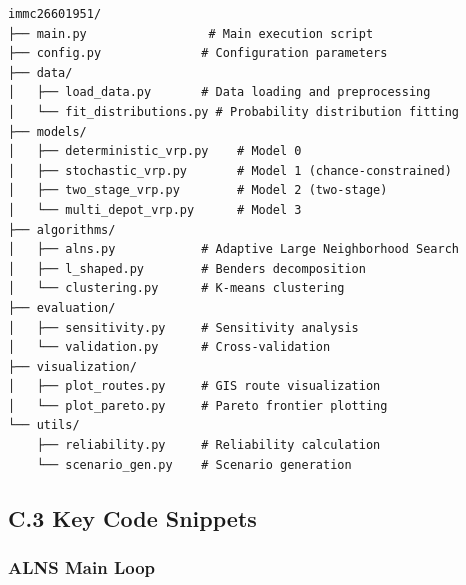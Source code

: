\begin{verbatim}
immc26601951/
├── main.py                 # Main execution script
├── config.py              # Configuration parameters
├── data/
│   ├── load_data.py       # Data loading and preprocessing
│   └── fit_distributions.py # Probability distribution fitting
├── models/
│   ├── deterministic_vrp.py    # Model 0
│   ├── stochastic_vrp.py       # Model 1 (chance-constrained)
│   ├── two_stage_vrp.py        # Model 2 (two-stage)
│   └── multi_depot_vrp.py      # Model 3
├── algorithms/
│   ├── alns.py            # Adaptive Large Neighborhood Search
│   ├── l_shaped.py        # Benders decomposition
│   └── clustering.py      # K-means clustering
├── evaluation/
│   ├── sensitivity.py     # Sensitivity analysis
│   └── validation.py      # Cross-validation
├── visualization/
│   ├── plot_routes.py     # GIS route visualization
│   └── plot_pareto.py     # Pareto frontier plotting
└── utils/
    ├── reliability.py     # Reliability calculation
    └── scenario_gen.py    # Scenario generation
\end{verbatim}

\subsection{C.3 Key Code Snippets}

\subsubsection{ALNS Main Loop}

